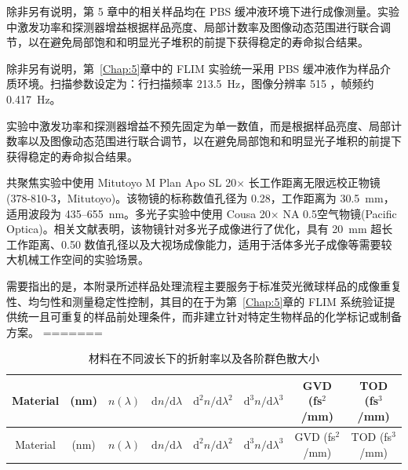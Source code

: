{除非另有说明，第 5 章中的相关样品均在 PBS 缓冲液环境下进行成像测量。实验中激发功率和探测器增益根据样品亮度、局部计数率及图像动态范围进行联合调节，以在避免局部饱和和明显光子堆积的前提下获得稳定的寿命拟合结果。

除非另有说明，第~\ref{Chap:5}章中的 FLIM 实验统一采用 PBS 缓冲液作为样品介质环境。扫描参数设定为：行扫描频率 213.5~Hz，图像分辨率 515 ，帧频约 0.417~Hz。

实验中激发功率和探测器增益不预先固定为单一数值，而是根据样品亮度、局部计数率以及图像动态范围进行联合调节，以在避免局部饱和和明显光子堆积的前提下获得稳定的寿命拟合结果。

共聚焦实验中使用 Mitutoyo M Plan Apo SL 20$\times$ 长工作距离无限远校正物镜(378-810-3，Mitutoyo)。该物镜的标称数值孔径为 0.28，工作距离为 30.5~mm，适用波段为 435--655~nm\cite{Mitutoyo20xSpec}。多光子实验中使用 Cousa 20$\times$ NA 0.5空气物镜(Pacific Optica)。相关文献表明，该物镜针对多光子成像进行了优化，具有 20~mm 超长工作距离、0.50 数值孔径以及大视场成像能力，适用于活体多光子成像等需要较大机械工作空间的实验场景\cite{Yu2024Cousa}。

需要指出的是，本附录所述样品处理流程主要服务于标准荧光微球样品的成像重复性、均匀性和测量稳定性控制，其目的在于为第~\ref{Chap:5}章的 FLIM 系统验证提供统一且可重复的样品前处理条件，而非建立针对特定生物样品的化学标记或制备方案。
=======

\small
\setlength{\tabcolsep}{4pt}
\renewcommand{\arraystretch}{1.1}

\begin{longtable}{cccccccc}
\caption{材料在不同波长下的折射率以及各阶群色散大小}
\label{dispersion}
\toprule
Material & (nm) & $n(\lambda)$ & $\mathrm{d}n/\mathrm{d}\lambda$ & $\mathrm{d}^2n/\mathrm{d}\lambda^2$ & $\mathrm{d}^3n/\mathrm{d}\lambda^3$ & GVD (fs$^2$/mm) & TOD (fs$^3$/mm) \\
\midrule
\endfirsthead

\toprule
Material & (nm) & $n(\lambda)$ & $\mathrm{d}n/\mathrm{d}\lambda$ & $\mathrm{d}^2n/\mathrm{d}\lambda^2$ & $\mathrm{d}^3n/\mathrm{d}\lambda^3$ & GVD (fs$^2$/mm) & TOD (fs$^3$/mm) \\
\midrule
\endhead


\end{longtable}}
